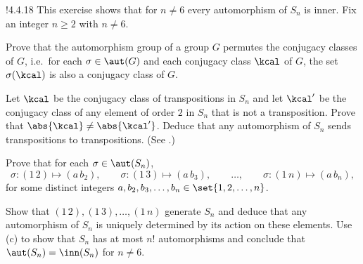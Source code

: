 \begin{exercise}!{4.4.18}
	This exercise shows that for $n\neq 6$ every automorphism of $S_n$ is inner.
	Fix an integer $n\geq 2$ with $n\neq 6$.
	\begin{subexercises}
		\item Prove that the automorphism group of a group $G$ permutes the conjugacy classes of $G$, i.e.\ for each $\sigma\in\aut(G)$ and each conjugacy class $\kcal$ of $G$, the set $\sigma(\kcal)$ is also a conjugacy class of $G$.
		\item Let $\kcal$ be the conjugacy class of transpositions in $S_n$ and let $\kcal'$ be the conjugacy class of any element of order $2$ in $S_n$ that is not a transposition.
		Prove that $\abs{\kcal}\neq\abs{\kcal'}$.
		Deduce that any automorphism of $S_n$ sends transpositions to transpositions. (See .)
		\item Prove that for each $\sigma\in\aut(S_n)$,
		\[
			\sigma:(1\,2)\mapsto(a\,b_2),\qquad \sigma:(1\,3)\mapsto(a\,b_3),\qquad \ldots,\qquad \sigma:(1\,n)\mapsto(a\,b_n),
		\]
		for some distinct integers $a,b_2,b_3,\ldots,b_n\in\set{1,2,\ldots,n}$.
		\item Show that $(1\,2),(1\,3),\ldots,(1\,n)$ generate $S_n$ and deduce that any automorphism of $S_n$ is uniquely determined by its action on these elements.
		Use (c) to show that $S_n$ has at most $n!$ automorphisms and conclude that $\aut(S_n)=\inn(S_n)$ for $n\neq 6$.
	\end{subexercises}
\end{exercise}

